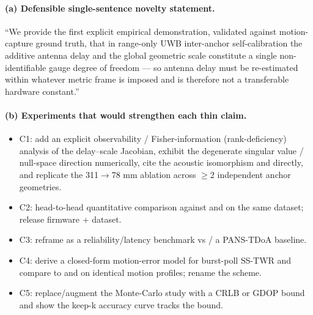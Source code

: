 \paragraph{(a) Defensible single-sentence novelty statement.}
\begin{displayquote}
``We provide the first explicit empirical demonstration, validated against motion-capture ground truth, that in range-only UWB inter-anchor self-calibration the additive antenna delay and the global geometric scale constitute a single non-identifiable gauge degree of freedom --- so antenna delay must be re-estimated within whatever metric frame is imposed and is therefore not a transferable hardware constant.''
\end{displayquote}

\paragraph{(b) Experiments that would strengthen each thin claim.}
\begin{itemize}[leftmargin=*]
\item C1: add an explicit observability / Fisher-information (rank-deficiency) analysis of the delay--scale Jacobian, exhibit the degenerate singular value / null-space direction numerically, cite the acoustic isomorphism \cite{kuang2013stratified,batstone2019robust} and \cite{lichti2010propagation} directly, and replicate the 311\(\to\)78 mm ablation across \(\geq\)2 independent anchor geometries.
\item C2: head-to-head quantitative comparison against \cite{piavanini2022calibration} and \cite{hamer2018selfcalibrating} on the same dataset; release firmware + dataset.
\item C3: reframe as a reliability/latency benchmark vs \cite{grosswindhager2019snaploc} / a PANS-TDoA baseline.
\item C4: derive a closed-form motion-error model for burst-poll SS-TWR and compare to \cite{sidorenko2020error} and \cite{dotlic2018ranging} on identical motion profiles; rename the scheme.
\item C5: replace/augment the Monte-Carlo study with a CRLB or GDOP bound and show the keep-k accuracy curve tracks the bound.
\end{itemize}

